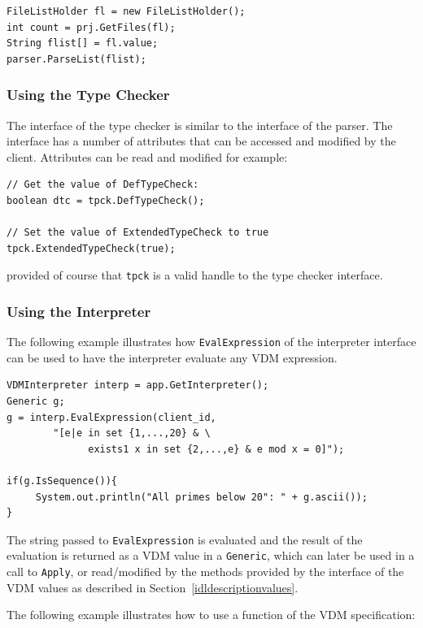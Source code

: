 \documentclass[\pformat,12pt]{article}
\begin{document}
\begin{verbatim}
FileListHolder fl = new FileListHolder();
int count = prj.GetFiles(fl);
String flist[] = fl.value;
parser.ParseList(flist);
\end{verbatim}

\subsubsection{Using the Type Checker}

The interface of the type checker is similar to the interface
of the parser. The interface has a number of attributes that can be
accessed and modified by the client. Attributes can be read and
modified for example:

\begin{verbatim}
// Get the value of DefTypeCheck:
boolean dtc = tpck.DefTypeCheck();

// Set the value of ExtendedTypeCheck to true
tpck.ExtendedTypeCheck(true);
\end{verbatim}

provided of course that \texttt{tpck} is a valid handle to the type checker interface. 


\subsubsection{Using the Interpreter}\label{java:interp}

The following example illustrates how {\tt EvalExpression} of the
interpreter interface can be used to have the interpreter evaluate any
VDM expression.

\begin{verbatim}
VDMInterpreter interp = app.GetInterpreter();
Generic g;
g = interp.EvalExpression(client_id, 
        "[e|e in set {1,...,20} & \
              exists1 x in set {2,...,e} & e mod x = 0]");

if(g.IsSequence()){
     System.out.println("All primes below 20": " + g.ascii());
}
\end{verbatim}

The string passed to {\tt EvalExpression} is evaluated and the result
of the evaluation is returned as a VDM value in a {\tt Generic},
  which can later be used in a call to {\tt Apply}, or read/modified by the
  methods provided by the interface of the VDM values as described in
  Section~\ref{idldescriptionvalues}.  

The following example illustrates how to use a function of the VDM
specification: 
\end{document}
